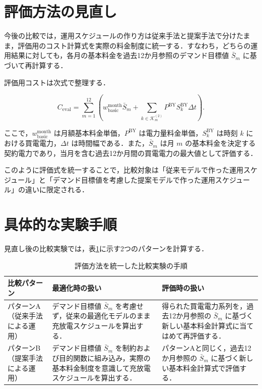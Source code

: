 \documentclass[a4paper,11pt,dvipdfmx]{jsarticle}
\begin{document}
\section{評価方法の見直し}
今後の比較では，運用スケジュールの作り方は従来手法と提案手法で分けたまま，評価用のコスト計算式を実際の料金制度に統一する．すなわち，どちらの運用結果に対しても，各月の基本料金を過去12か月参照のデマンド目標値 $\bar{S}_{m}$ に基づいて再計算する．

評価用コストは次式で整理する．

\begin{equation}
    C_{\mathrm{eval}}
    =
    \sum_{m=1}^{12}
    \left(
    w_{\mathrm{basic}}^{\mathrm{month}} \bar{S}_{m}
    +
    \sum_{k \in \mathcal{K}^{(2)}_{m}}
    P^{\mathrm{BY}} S^{\mathrm{BY}}_{k} \Delta t
    \right).
\end{equation}

ここで，$w_{\mathrm{basic}}^{\mathrm{month}}$ は月額基本料金単価，$P^{\mathrm{BY}}$ は電力量料金単価，$S^{\mathrm{BY}}_{k}$ は時刻 $k$ における買電電力，$\Delta t$ は時間幅である．また，$\bar{S}_{m}$ は月 $m$ の基本料金を決定する契約電力であり，当月を含む過去12か月間の買電電力の最大値として評価する．

このように評価式を統一することで，比較対象は「従来モデルで作った運用スケジュール」と「デマンド目標値を考慮した提案モデルで作った運用スケジュール」の違いに限定される．

\section{具体的な実験手順}
見直し後の比較実験では，表\ref{tab:experiment_plan}に示す2つのパターンを計算する．

\begin{table}[H]
    \centering
    \caption{評価方法を統一した比較実験の手順}
    \label{tab:experiment_plan}
    \begin{tabular}{p{25mm}p{55mm}p{65mm}}
        \toprule
        比較パターン & 最適化時の扱い                                                             & 評価時の扱い \\
        \midrule
        パターンA（従来手法による運用）
               & デマンド目標値 $\bar{S}_{m}$ を考慮せず，従来の最適化モデルのまま充放電スケジュールを算出する．
               & 得られた買電電力系列を，過去12か月参照の $\bar{S}_{m}$ に基づく新しい基本料金計算式に当てはめて再評価する．               \\
        \midrule
        パターンB（提案手法による運用）
               & デマンド目標値 $\bar{S}_{m}$ を制約および目的関数に組み込み，実際の基本料金制度を意識して充放電スケジュールを算出する．
               & パターンAと同じく，過去12か月参照の $\bar{S}_{m}$ に基づく新しい基本料金計算式で評価する．                       \\
        \bottomrule
    \end{tabular}
\end{table}
\end{document}
